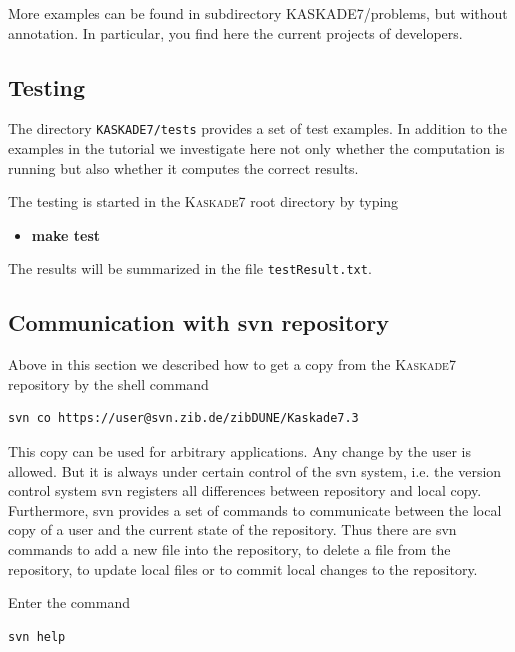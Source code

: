 \documentclass[11pt]{article}
\newcommand{\K}{\textsc{Kaskade7 }}
\begin{document}
\noindent More examples can be
found in subdirectory KASKADE7/problems, but without annotation. In particular, you find
here the current projects of developers. 


\subsection{Testing}
The directory {\tt KASKADE7/tests} provides a set of test examples. 
In addition to the examples in the tutorial we investigate here not only whether the 
computation is running but also whether it computes the correct results.

\noindent The testing is started in the \K root directory by typing
\begin{itemize}
\item {\bf make test}
\end{itemize}

\noindent The results will be summarized in the file {\tt testResult.txt}.

\subsection{Communication with svn repository}\label{svn}
Above in this section we described how to get a copy from the \K repository by 
the shell command

\begin{scriptsize} 
\begin{verbatim} 
svn co https://user@svn.zib.de/zibDUNE/Kaskade7.3
\end{verbatim} 
\end{scriptsize} 

\noindent This copy can be used for arbitrary applications. Any change by the user is allowed.
But it is always under certain control of the svn system, i.e. the version control system svn registers
all differences between repository and local copy.
Furthermore, svn provides a set of commands to 
communicate between the local copy of a user and the current state
of the repository. Thus there are svn commands to add a new file
into the repository, to delete a file from the repository, to update
local files or to commit local changes to the repository.

Enter the command 

\begin{scriptsize} 
\begin{verbatim} 
svn help
\end{verbatim} 
\end{scriptsize} 
\end{document}
